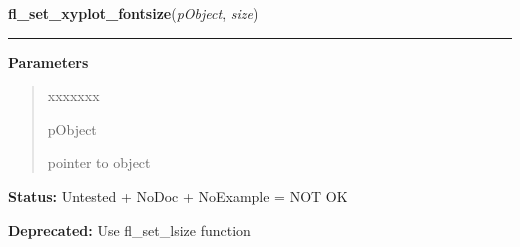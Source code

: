 \hspace{.8\funcindent}\begin{boxedminipage}{\funcwidth}

    \raggedright \textbf{fl\_set\_xyplot\_fontsize}(\textit{pObject}, \textit{size})

    \vspace{-1.5ex}

    \rule{\textwidth}{0.5\fboxrule}
\setlength{\parskip}{2ex}
\setlength{\parskip}{1ex}
      \textbf{Parameters}
      \vspace{-1ex}

      \begin{quote}
        \begin{Ventry}{xxxxxxx}

          \item[pObject]

          pointer to object

        \end{Ventry}

      \end{quote}

\textbf{Status:} Untested + NoDoc + NoExample = NOT OK



\textbf{Deprecated:} Use fl\_set\_lsize function



    \end{boxedminipage}

    \label{xformslib:library:fl_set_xyplot_fontstyle}

    \vspace{0.5ex}

